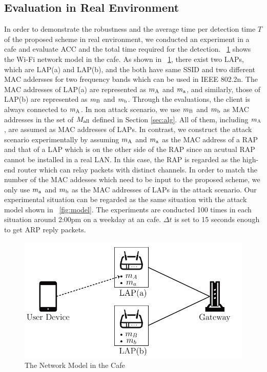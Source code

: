 \documentclass[conference]{IEEEtran}
\newcommand{\stba}{m_{\rm a}}
\newcommand{\stbA}{m_{\rm A}}
\newcommand{\stbb}{m_{\rm b}}
\newcommand{\stbB}{m_{\rm B}}
\begin{document}
\subsection{Evaluation in Real Environment}
In order to demonstrate the robustness and the average time per detection time $T$ of the proposed scheme in real environment, we conducted an experiment in a cafe and evaluate ACC and the total time required for the detection.
\figurename~\ref{fig:sbx} shows the Wi-Fi network model in the cafe.
As shown in \figurename~\ref{fig:sbx}, there exist two LAPs, which are LAP(a) and LAP(b), and the both have same SSID and two different MAC addersses for two frequency bands which can be used in IEEE 802.2n.
The MAC addresses of LAP(a) are represented as $\stbA$ and $\stba$, and similarly, those of LAP(b) are represented as $\stbB$ and $\stbb$.
Through the evaluations, the client is always connected to $\stbA$.
In non attack scenario, we use $\stbB$ and $\stbb$ as MAC addresses in the set of $M_{\rm all}$ defined in Section \ref{sec:alg}.
All of them, including $\stbA$, are assumed as MAC addresses of LAPs.
In contrast, we construct the attack scenario experimentally by assuming $\stbA$ and $\stba$ as the MAC address of a RAP and that of a LAP which is on the other side of the RAP since an acutual RAP cannot be installed in a real LAN.
In this case, the RAP is regarded as the high-end router which can relay packets with distinct channels.
In order to match the number of the MAC addesses which need to be input to the proposed scheme, we only use $\stba$ and $\stbb$ as the MAC addresses of LAPs in the attack scenario.
Our experimental situation can be regarded as the same situation with the attack model shown in \figurename~\ref{fig:model}.
The experiments are conducted 100 times in each situation around 2:00pm on a weekday at an cafe.
$\Delta t$ is set to 15 seconds enough to get ARP reply packets.
\begin{figure}[t]
    \begin{center}
        \includegraphics[scale=0.5]{starbucks/starbucks.pdf}
        \caption{The Network Model in the Cafe}
        \label{fig:sbx}
    \end{center}
    \vspace{-1zh}
\end{figure}
\end{document}
